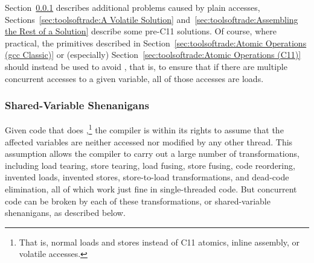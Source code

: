 \QuickQuizEnd

Section~\ref{sec:toolsoftrade:Shared-Variable Shenanigans}
describes additional problems caused by plain accesses,
Sections~\ref{sec:toolsoftrade:A Volatile Solution}
and~\ref{sec:toolsoftrade:Assembling the Rest of a Solution}
describe some pre-C11 solutions.
Of course, where practical, the primitives described in
Section~\ref{sec:toolsoftrade:Atomic Operations (gcc Classic)}
or (especially)
Section~\ref{sec:toolsoftrade:Atomic Operations (C11)}
should instead be used to avoid , that is, to ensure
that if there are multiple concurrent accesses to a given
variable, all of those accesses are loads.

\subsubsection{Shared-Variable Shenanigans}
\label{sec:toolsoftrade:Shared-Variable Shenanigans}
%
Given code that does ,\footnote{
	That is, normal loads and stores instead of C11 atomics, inline
	assembly, or volatile accesses.}
the compiler is within
its rights to assume that the affected variables are neither accessed
nor modified by any other thread.
This assumption allows the compiler to carry out a large number of
transformations, including load tearing, store tearing,
load fusing, store fusing, code reordering, invented loads,
invented stores, store-to-load transformations, and dead-code elimination,
all of which work just fine in single-threaded code.
But concurrent code can be broken by each of these transformations,
or shared-variable shenanigans, as described below.

